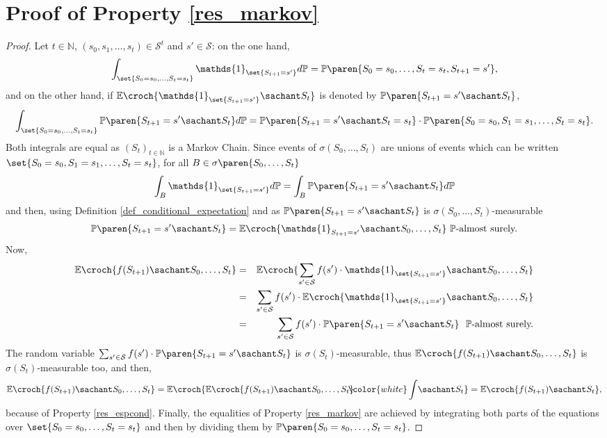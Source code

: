\section{Proof of Property \ref{res_markov}}
\begin{proof}
Let $t \in \mathbb{N}$, $(s_0,s_1,\ldots,s_t) \in \mathcal{S}^t$ and $s' \in \mathcal{S}$: 
on the one hand,
\begin{equation*}
\int_{ \set{ S_0=s_0,\ldots,S_t=s_t } } \mathds{1}_{ \set{S_{t+1} =s'}} d \mathbb{P} = \mathbb{P} \paren{ S_0=s_0,\ldots,S_t=s_t,S_{t+1}=s' },
\end{equation*}
and on the other hand, if $\mathbb{E} \croch{ \mathds{1}_{\set{S_{t+1} = s'}} \sachant S_t }$ 
is denoted by $\mathbb{P} \paren{ S_{t+1} = s' \sachant S_t }$,
\[ \displaystyle \int_{ \set{ S_0=s_0,\ldots,S_t=s_t } } \mathbb{P} \paren{ S_{t+1} = s' \sachant S_t } d \mathbb{P} 
= \mathbb{P} \paren{ S_{t+1} = s' \sachant S_t=s_t } \cdot \mathbb{P} \paren{ S_0=s_0,S_1=s_1,\ldots,S_t=s_t }.\]
Both integrals are equal as $(S_t)_{t \in \mathbb{N}}$ is a Markov Chain. 
Since events of $\sigma(S_0,\ldots,S_t)$ are unions of events which can be written $ \set{S_0=s_0,S_1=s_1,\ldots,S_t=s_t}$, 
for all $B \in \sigma \paren{ S_0,\ldots,S_t }$
\[ \int_B \mathds{1}_{ \set{S_{t+1} =s'}} d \mathbb{P} = \int_B  \mathbb{P}  \paren{ S_{t+1} = s' \sachant S_t }  d \mathbb{P}  \]
and then, using Definition \ref{def_conditional_expectation} and as 
$ \mathbb{P}  \paren{ S_{t+1} = s' \sachant S_t }$ is $\sigma(S_0,\ldots,S_t)$-measurable
\[ \mathbb{P}  \paren{ S_{t+1} = s' \sachant S_t } = \mathbb{E} \croch{ \mathds{1}_{S_{t+1} =s'} \sachant S_0,\ldots,S_t  } \ \mathbb{P}\mbox{-almost surely.} \]
Now, 
\begin{eqnarray*}
\mathbb{E} \croch{ f(S_{t+1}) \sachant S_0,\ldots,S_t } 
& = & \mathbb{E} \croch{ \sum_{s' \in \mathcal{S}} f(s') \cdot \mathds{1}_{ \set{S_{t+1}=s'} }  \sachant S_0,\ldots,S_t } \\
& = & \sum_{s' \in \mathcal{S}} f(s') \cdot \mathbb{E} \croch{ \mathds{1}_{\set{S_{t+1}=s'}}  \sachant S_0,\ldots,S_t } \\
& = & \sum_{s' \in \mathcal{S}} f(s') \cdot \mathbb{P} \paren{ S_{t+1}=s'  \sachant S_t } \ \ \mathbb{P}\mbox{-almost surely.} %
\end{eqnarray*}
The random variable $\sum_{s' \in \mathcal{S}} f(s') \cdot \mathbb{P} \paren{ S_{t+1}=s'  \sachant S_t }$ 
is $\sigma(S_t)$-measurable, thus $\mathbb{E} \croch{ f(S_{t+1}) \sachant S_0,\ldots,S_t } $
is $\sigma(S_t)$-measurable too, and then,
\[ \mathbb{E} \croch{ f(S_{t+1}) \sachant S_0,\ldots,S_t }  = \mathbb{E} \croch{ \mathbb{E} \croch{ f(S_{t+1}) \sachant S_0,\ldots,S_t } \hspace{-0.23cm} {\color{white} \int} \sachant S_t } = \mathbb{E} \croch{ f(S_{t+1}) \sachant S_t },  \]
because of Property \ref{res_espcond}.
Finally, the equalities of Property \ref{res_markov} are achieved 
by integrating both parts of the equations 
over $\set{S_0 = s_0, \ldots, S_t = s_t}$
and then by dividing them 
by $\mathbb{P} \paren{ S_0 = s_0, \ldots, S_t = s_t }$.
\end{proof}
